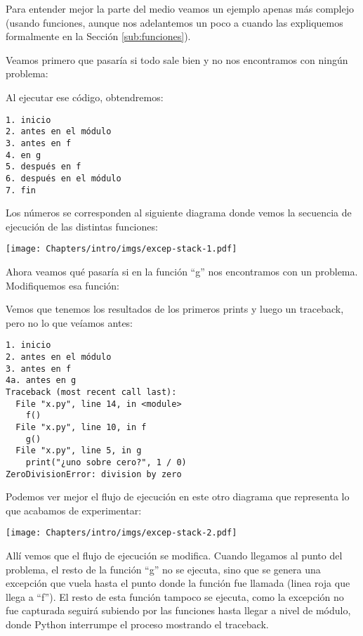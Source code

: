 Para entender mejor la parte del medio veamos un ejemplo apenas más complejo (usando funciones, aunque nos adelantemos un poco a cuando las expliquemos formalmente en la Sección \ref{sub:funciones}).

Veamos primero que pasaría si todo sale bien y no nos encontramos con ningún problema:


Al ejecutar ese código, obtendremos:

\begin{verbatim}
1. inicio
2. antes en el módulo
3. antes en f
4. en g
5. después en f
6. después en el módulo
7. fin
\end{verbatim}  

Los números se corresponden al siguiente diagrama donde vemos la secuencia de ejecución de las distintas funciones:

\begin{center}
    \texttt{[image: Chapters/intro/imgs/excep-stack-1.pdf]}
\end{center}

Ahora veamos qué pasaría si en la función ``g'' nos encontramos con un problema. Modifiquemos esa función:


Vemos que tenemos los resultados de los primeros prints y luego un traceback, pero no lo que veíamos antes:

\begin{verbatim}
1. inicio
2. antes en el módulo
3. antes en f
4a. antes en g
Traceback (most recent call last):
  File "x.py", line 14, in <module>
    f()
  File "x.py", line 10, in f
    g()
  File "x.py", line 5, in g
    print("¿uno sobre cero?", 1 / 0)
ZeroDivisionError: division by zero
\end{verbatim}  

Podemos ver mejor el flujo de ejecución en este otro diagrama que representa lo que acabamos de experimentar:

\begin{center}
    \texttt{[image: Chapters/intro/imgs/excep-stack-2.pdf]}
\end{center}

Allí vemos que el flujo de ejecución se modifica. Cuando llegamos al punto del problema, el resto de la función ``g'' no se ejecuta, sino que se genera una excepción que vuela hasta el punto donde la función fue llamada (linea roja que llega a ``f''). El resto de esta función tampoco se ejecuta, como la excepción no fue capturada seguirá subiendo por las funciones hasta llegar a nivel de módulo, donde Python interrumpe el proceso mostrando el traceback.

